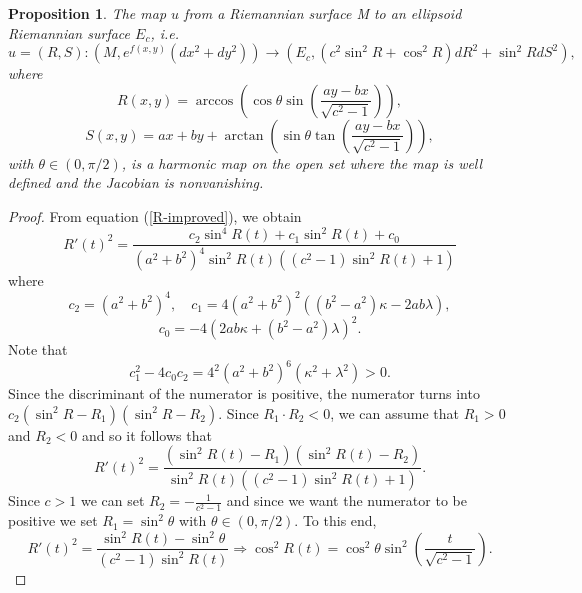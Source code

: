 \documentclass[12pt]{amsart}
\newtheorem{proposition}[theorem]{Proposition}
\begin{document}
\begin{proposition}
		The map $u$ from a Riemannian surface M to an ellipsoid Riemannian surface $E_c$, i.e.
		\[
		u = (R,S): (M,e^{f(x,y)}(dx^2 + dy^2)) \rightarrow 
		(E_c, (c^2\sin^2R + \cos^2R)dR^2 + \sin^2R dS^2),
		\]
		where 
		\[
		R(x,y) = 
		\arccos
		\left(
		\cos\theta \sin
		\left(\frac{ay - bx}{\sqrt{c^2 - 1}}
		\right)
		\right),
		\]
		\[
		S(x,y) = 
		ax + by +
		\arctan
		\left(\sin\theta 
		\tan
		\left(\frac{ay - bx}{\sqrt{c^2 - 1}}
		\right)
		\right),
		\]
		with $\theta \in (0,\pi/2)$, is a harmonic map on the open set where the map is well defined and the Jacobian is nonvanishing.
	\end{proposition}
	\begin{proof}
		From equation (\ref{R-improved}), we obtain
		\[
		R'(t)^2 = \frac{c_2\sin^4R(t) + c_1\sin^2R(t) + c_0}
		{(a^2 + b^2)^4\sin^2R(t)((c^2 - 1)\sin^2R(t) + 1)}
		\]
		where 
		\[
		c_2 = (a^2 + b^2)^4, \quad 
		c_1 = 4(a^2 + b^2)^2
		\left(
		(b^2 - a^2)\kappa - 2ab\lambda
		\right),
		\]
		\[
		c_0 = - 4\left(
		2ab\kappa + (b^2 - a^2)\lambda
		\right)^2.
		\]
		Note that 
		\[c_{1}^2-4c_0 c_2 = 4^2 (a^2+b^2)^6 (\kappa^2 + \lambda^2) > 0.\]
		Since the discriminant of the numerator is positive, the numerator turns into $c_2(\sin^2R - R_1)(\sin^2R - R_2)$. Since $R_1 \cdot R_2 < 0$,  we can assume that $R_1 > 0$ and $R_2 < 0$ and so it follows that
		\[
		R'(t)^2 = \frac
		{(\sin^2 R(t) - R_1)(\sin^2 R(t) - R_2)}
		{\sin^2R(t)
			\left((c^2 - 1)\sin^2R(t) + 1\right)}.
		\]
		Since $c > 1$ we can set $R_2 = - \frac{1}{c^2 - 1}$ and since we want the numerator to be positive we set $R_1 = \sin^2\theta$ with $\theta \in (0,\pi/2)$. To this end, 
		\[
		R'(t)^2 = \frac{\sin^2 R(t) - \sin^2\theta}
		{(c^2 - 1)\sin^2R(t)}
		\Rightarrow
		\cos^2R(t) = \cos^2\theta\sin^2
		\left(\frac{t}{\sqrt{c^2 - 1}}\right).
		\]
		

\end{proof}
\end{document}
